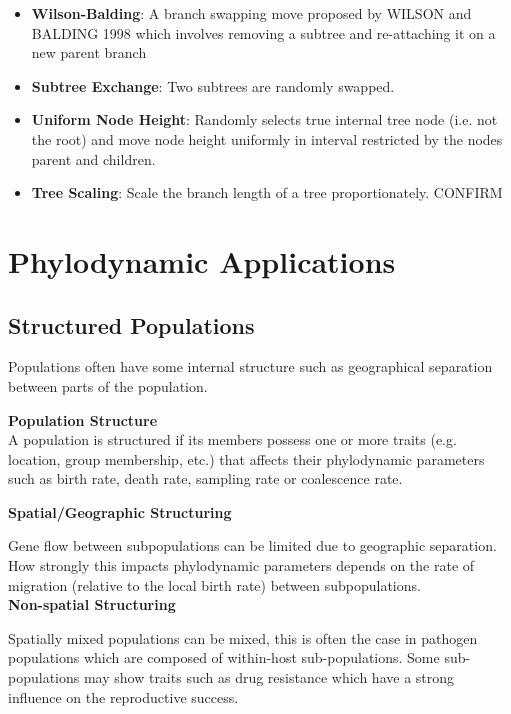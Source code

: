 \documentclass{article}
\begin{document}
\begin{multicols*}{3}
\begin{itemize}
    \item \textbf{Wilson-Balding}: A branch swapping move proposed by WILSON and BALDING 1998 which involves removing a subtree and re-attaching it on a new parent branch
    \item \textbf{Subtree Exchange}: Two subtrees are randomly swapped. \item \textbf{Uniform Node Height}: Randomly selects true internal tree node (i.e. not the root) and move node height uniformly in interval restricted by the nodes parent and children.
    \item \textbf{Tree Scaling}: Scale the branch length of a tree proportionately. {\color{red} CONFIRM}
\end{itemize}

\section{Phylodynamic Applications}

\subsection{Structured Populations}

Populations often have some internal structure such as geographical separation between parts of the population. 

\begin{mdframed}[backgroundcolor=astral] 
    \textbf{Population Structure}\\
    A population is structured if its members possess one or more traits (e.g. location, group membership, etc.) that affects their phylodynamic parameters such as birth rate, death rate, sampling rate or coalescence rate. 
\end{mdframed}

\textbf{Spatial/Geographic Structuring}

Gene flow between subpopulations can be limited due to geographic separation. How strongly this impacts phylodynamic parameters depends on the rate of migration (relative to the local birth rate) between subpopulations.\\

\textbf{Non-spatial Structuring}

Spatially mixed populations can be mixed, this is often the case in pathogen populations which are composed of within-host sub-populations. Some sub-populations may show traits such as drug resistance which have a strong influence on the reproductive success.\\


\end{multicols*}
\end{document}

